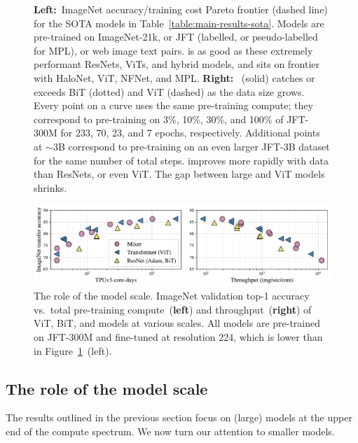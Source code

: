 \begin{figure}[tb]
\begin{subfigure}{.51\textwidth}
\end{subfigure}
\caption{
  {\bf Left:}~ImageNet accuracy/training cost Pareto frontier (dashed line) for the SOTA models 
  in
  Table~\ref{table:main-results-sota}.
  Models are pre-trained on ImageNet-21k, or JFT (labelled, or pseudo-labelled for MPL), or 
  web image text pairs.
  \name{} is as good as these extremely performant ResNets, ViTs, and hybrid models,
  and sits on frontier with HaloNet, ViT, NFNet, and MPL.
  {\bf Right:}~\name{} (solid) catches or exceeds BiT (dotted) and ViT (dashed) as the data size grows.
  Every point on a curve uses the same pre-training compute; they correspond to pre-training on 3\%, 10\%, 30\%, and 100\% of JFT-300M for 233, 70, 23, and 7 epochs, respectively.
  Additional points at $\sim$3B correspond to pre-training on an even larger JFT-3B dataset for the same number of total steps.
  \name{} improves more rapidly with data than ResNets, or even ViT.
  The gap between large \name{} and ViT models shrinks.
}
\vspace{-.1cm}
\label{fig:main-sota-and-jft-fractions}
\end{figure}

\begin{figure}[tb]
    \centering
    \includegraphics[width=.9\linewidth]{pics/finetune_vs_compute.pdf}
  \caption{
  The role of the model scale.
  ImageNet validation top-1 accuracy vs.\ total pre-training compute~({\bf left}) and throughput~({\bf right}) of ViT, BiT, and \name{} models at various scales.
  All models are pre-trained on JFT-300M and fine-tuned at resolution 224, which is lower than in Figure~\ref{fig:main-sota-and-jft-fractions}~(left).}
  \label{fig:compute-frontier}
  \vspace{-.4cm}
\end{figure}

\subsection{The role of the model scale}
\label{sec:model-scale}
The results outlined in the previous section focus on (large) models at the upper end of the compute spectrum.
We now turn our attention to smaller \name{} models.

